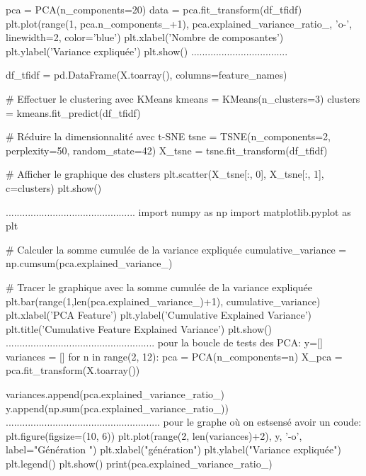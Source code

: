 pca = PCA(n_components=20)
data = pca.fit_transform(df_tfidf)
plt.plot(range(1, pca.n_components_+1), pca.explained_variance_ratio_, 'o-', linewidth=2, color='blue')
plt.xlabel('Nombre de composantes')
plt.ylabel('Variance expliquée')
plt.show()
...................................


df_tfidf = pd.DataFrame(X.toarray(), columns=feature_names)

# Effectuer le clustering avec KMeans
kmeans = KMeans(n_clusters=3)
clusters = kmeans.fit_predict(df_tfidf)

# Réduire la dimensionnalité avec t-SNE
tsne = TSNE(n_components=2, perplexity=50, random_state=42)
X_tsne = tsne.fit_transform(df_tfidf)

# Afficher le graphique des clusters
plt.scatter(X_tsne[:, 0], X_tsne[:, 1], c=clusters)
plt.show()

...............................................
import numpy as np
import matplotlib.pyplot as plt

# Calculer la somme cumulée de la variance expliquée
cumulative_variance = np.cumsum(pca.explained_variance_)

# Tracer le graphique avec la somme cumulée de la variance expliquée
plt.bar(range(1,len(pca.explained_variance_)+1), cumulative_variance)
plt.xlabel('PCA Feature')
plt.ylabel('Cumulative Explained Variance')
plt.title('Cumulative Feature Explained Variance')
plt.show()
......................................................
pour la boucle de tests des PCA:
y=[]
variances = []
for n in range(2, 12):
    pca = PCA(n_components=n)
    X_pca = pca.fit_transform(X.toarray())

    variances.append(pca.explained_variance_ratio_)
    y.append(np.sum(pca.explained_variance_ratio_))
........................................................
pour le graphe où on estsensé avoir un coude:
plt.figure(figsize=(10, 6))
plt.plot(range(2, len(variances)+2), y, '-o', label="Génération ")
plt.xlabel("génération")
plt.ylabel("Variance expliquée")
plt.legend()
plt.show()
print(pca.explained_variance_ratio_)